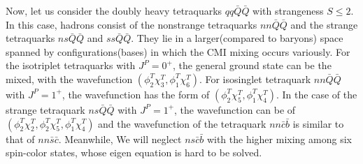 \documentclass[12pt,prd,onecolumn,floatfix,nofootinbib]{revtex4}
\begin{document}
Now, let us consider the doubly heavy tetraquarks $qq\bar{Q}\bar{Q}$ with
strangeness $S\leq 2$. In this case, hadrons consist of the nonstrange
tetraquarks $nn\bar{Q}\bar{Q}$ and the strange tetraquarks $ns\bar{Q}\bar{Q}$
and $ss\bar{Q}\bar{Q}$. They lie in a larger(compared to baryons) space spanned 
by configurations(bases) in which the CMI mixing occurs variously. For the isotriplet 
tetraquarks with $J^{P}=0^{+}$, the general ground state can be the mixed, with 
the wavefunction $(\phi _{2}^{T}\chi_{3}^{T},\phi _{1}^{T}\chi _{6}^{T})$. 
For isosinglet tetraquark $nn\bar{Q}\bar{Q}$ with $J^{P}=1^{+}$, the 
wavefunction has the form of $(\phi_{2}^{T}\chi _{5}^{T},\phi _{1}^{T}\chi _{4}^{T})$. 
In the case of the strange tetraquark $ns\bar{Q}\bar{Q}$ with $J^{P}=1^{+}$, 
the wavefunction can be of $(\phi _{2}^{T}\chi _{2}^{T},\phi _{2}^{T}\chi _{5}^{T},\phi
_{1}^{T}\chi _{4}^{T})$ and the wavefunction of the tetraquark $nn$$\bar{c}%
\bar{b}$ is similar to that of $nn\bar{s}\bar{c}$. Meanwhile, We will neglect 
$ns\bar{c}\bar{b}$ with the higher mixing among six spin-color states, 
whose eigen equation is hard to be solved.
\end{document}
